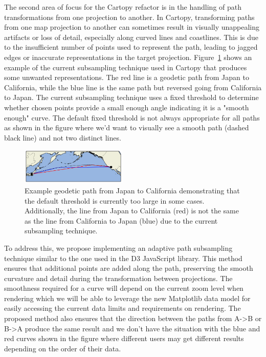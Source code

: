 \documentclass[12pt]{article}
\numberwithin{page}{section}
\begin{document}
The second area of focus for the Cartopy refactor is in the handling of path transformations from
one projection to another. In Cartopy, transforming paths from one map projection to another can
sometimes result in visually unappealing artifacts or loss of detail,
especially along curved lines and coastlines. This is due to the insufficient
number of points used to represent the path, leading to jagged edges or inaccurate
representations in the target projection.
Figure~\ref{fig:cartopy_interpolation} shows an example of the current subsampling technique
used in Cartopy that produces some unwanted representations.
The red line is a geodetic path from Japan to California, while the blue line
is the same path but reversed going from California to Japan. The current subsampling technique
uses a fixed threshold to determine whether chosen points provide a small enough angle indicating
it is a "smooth enough" curve. The default fixed threshold is not always appropriate for all
paths as shown in the figure where we'd want to visually see a smooth path (dashed black line) and not two distinct lines.

\begin{figure}
  \includegraphics[width=0.45\textwidth]{supplemental/cartopy_interpolation}
  \caption{\small Example geodetic path from Japan to California demonstrating
  that the default threshold is currently too large in some cases. Additionally,
  the line from Japan to California (red) is not the same as the line from
  California to Japan (blue) due to the current subsampling technique.}
  \label{fig:cartopy_interpolation}
\end{figure}


To address this, we propose implementing an adaptive path subsampling technique similar to
the one used in the D3 JavaScript library. This method ensures that additional points are
added along the path, preserving the smooth curvature and detail during the
transformation between projections. The smoothness required for a curve will depend on the current
zoom level when rendering which we will be able to leverage the new Matplotlib data model for easily
accessing the current data limits and requirements on rendering. The proposed method also ensures that
the direction between the paths from
A->B or B->A produce the same result and we don't have the situation with the blue and red curves
shown in the figure where different users may get different results depending on the order of their data.
\end{document}
